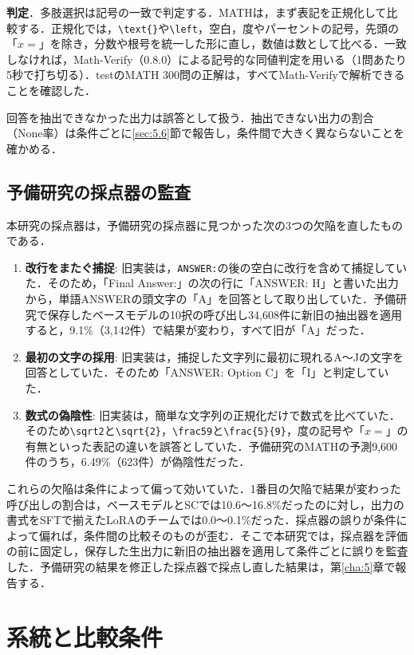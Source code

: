 \textbf{判定}．多肢選択は記号の一致で判定する．MATHは，まず表記を正規化して比較する．正規化では，\verb|\text{}|や\verb|\left|，空白，度やパーセントの記号，先頭の「$x=$」を除き，分数や根号を統一した形に直し，数値は数として比べる．一致しなければ，Math-Verify\cite{kydlicek2025mathverify}（0.8.0）による記号的な同値判定を用いる（1問あたり5秒で打ち切る）．testのMATH 300問の正解は，すべてMath-Verifyで解析できることを確認した．

回答を抽出できなかった出力は誤答として扱う．抽出できない出力の割合（None率）は条件ごとに\ref{sec:5.6}節で報告し，条件間で大きく異ならないことを確かめる．

\subsection{予備研究の採点器の監査}
\label{sec:4.3.2}

本研究の採点器は，予備研究の採点器に見つかった次の3つの欠陥を直したものである．
\begin{enumerate}
\item \textbf{改行をまたぐ捕捉}: 旧実装は，\texttt{ANSWER:}の後の空白に改行を含めて捕捉していた．そのため，「Final Answer:」の次の行に「ANSWER: H」と書いた出力から，単語ANSWERの頭文字の「A」を回答として取り出していた．予備研究で保存したベースモデルの10択の呼び出し34,608件に新旧の抽出器を適用すると，9.1\%（3,142件）で結果が変わり，すべて旧が「A」だった．
\item \textbf{最初の文字の採用}: 旧実装は，捕捉した文字列に最初に現れるA〜Jの文字を回答としていた．そのため「ANSWER: Option C」を「I」と判定していた．
\item \textbf{数式の偽陰性}: 旧実装は，簡単な文字列の正規化だけで数式を比べていた．そのため\verb|\sqrt2|と\verb|\sqrt{2}|，\verb|\frac59|と\verb|\frac{5}{9}|，度の記号や「$x=$」の有無といった表記の違いを誤答としていた．予備研究のMATHの予測9,600件のうち，6.49\%（623件）が偽陰性だった．
\end{enumerate}

これらの欠陥は条件によって偏って効いていた．1番目の欠陥で結果が変わった呼び出しの割合は，ベースモデルとSCでは10.6〜16.8\%だったのに対し，出力の書式をSFTで揃えたLoRAのチームでは0.0〜0.1\%だった．採点器の誤りが条件によって偏れば，条件間の比較そのものが歪む．そこで本研究では，採点器を評価の前に固定し，保存した生出力に新旧の抽出器を適用して条件ごとに誤りを監査した．予備研究の結果を修正した採点器で採点し直した結果は，第\ref{cha:5}章で報告する．

\section{系統と比較条件}
\label{sec:4.4}


